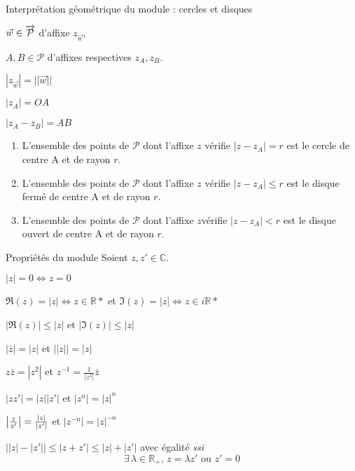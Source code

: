     \begin{prop}{Interprétation géométrique du module : cercles et disques}{}
        \begin{soient}
            \item $\vec{w} \in \overrightarrow{\mathcal{P}}$ d’affixe $z_{\vec{w}}$,
            \item $A,B \in \mathcal{P}$ d’affixes respectives $z_A,z_B$.
        \end{soient}
        \begin{alors}
            \item $|z_{\vec{w}}| = ||\vec{w}||$
            \item $|z_A| = OA$
            \item $|z_A - z_B| = AB$
            \item \begin{enumerate}[label=(\alph*)]
                \item L’ensemble des points de $\mathcal{P}$ dont l’affixe $z$ vérifie $|z - z_A| = r$ est le cercle de centre A et de rayon $r$.
                \item L’ensemble des points de $\mathcal{P}$ dont l’affixe $z$ vérifie $|z - z_A| \leq r$ est le disque fermé de centre A et de rayon $r$.
                \item L’ensemble des points de $\mathcal{P}$ dont l’affixe $z $vérifie $|z - z_A| < r$ est le disque ouvert de centre A et de rayon $r$.
            \end{enumerate}
        \end{alors}
    \end{prop}

    \begin{prop}{Propriétés du module}{}
        Soient $z,z' \in \mathbb{C}$.
    
        \begin{alors}
            \item $|z| = 0 \Leftrightarrow z = 0$
            \item $\Re(z) = |z| \Leftrightarrow z \in \mathbb{R}*$ et $\Im(z) = |z| \Leftrightarrow z \in i \mathbb{R}*$
            \item $|\Re(z)| \leq |z|$ et $|\Im(z)| \leq |z|$
            \item $|\bar{z}| = |z|$ et $||z|| = |z|$
            \item $z \bar{z} = |z^2|$ et $z^{-1} = \frac{1}{|z^2|} \bar{z}$
            \item $|zz'| = |z||z'|$ et $|z^n|=|z|^n $
            \item $\left\lvert \frac{z}{z'}\right\rvert = \frac{|z|}{|z'|}$ et $|z^{-n}| = |z|^{-n}$
            \item $\big||z|-|z'|\big| \leq |z+z'| \leq |z|+|z'|$ avec égalité \textit{ssi}
            \[ \exists \, \lambda \in \mathbb{R}_+, \, z = \lambda z' \text{ ou } z' = 0 \]
        \end{alors}
    \end{prop}

